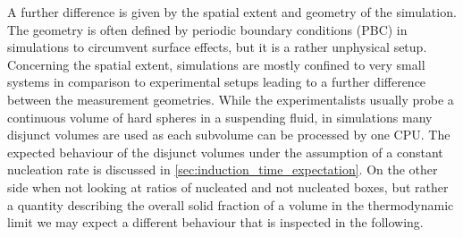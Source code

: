 A further difference is given by the spatial extent and geometry of the simulation. The geometry is often defined by periodic boundary conditions (PBC) in simulations to circumvent surface effects, but it is a rather unphysical setup.\\ 
Concerning the spatial extent, simulations are mostly confined to very small systems in comparison to experimental setups leading to a further difference between the measurement geometries. While the experimentalists usually probe a continuous volume of hard spheres in a suspending fluid, in simulations many disjunct volumes are used as each subvolume can be processed by one CPU. The expected behaviour of the disjunct volumes under the assumption of a constant nucleation rate is discussed in \autoref{sec:induction_time_expectation}. On the other side when not looking at ratios of nucleated and not nucleated boxes, but rather a quantity describing the overall solid fraction of a volume in the thermodynamic limit we may expect a different behaviour that is inspected in the following.\\

